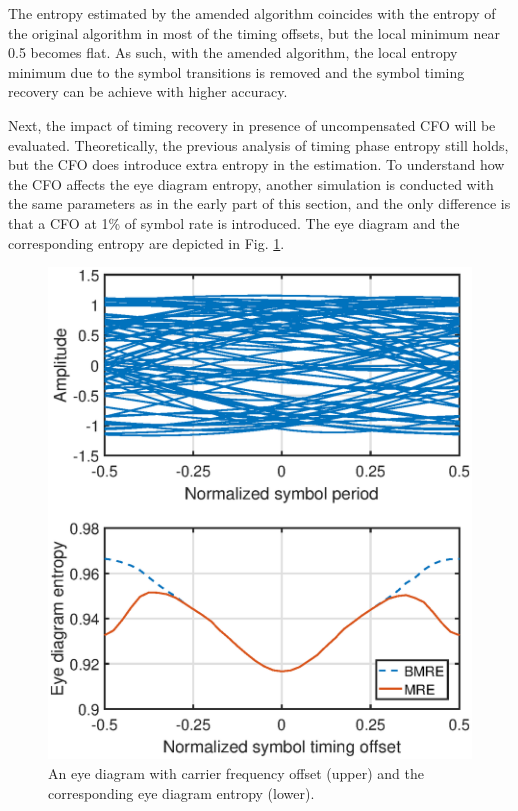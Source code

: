 \documentclass[journal,comsoc,onecolumn, 12pt,draftclsnofoot]{IEEEtran}
\begin{document}
The entropy estimated by the amended algorithm coincides with the entropy of the original algorithm in most of the timing offsets, but the local minimum near 0.5 becomes flat.
As such, with the amended algorithm, the local entropy minimum due to the symbol transitions is removed and the symbol timing recovery can be achieve with higher accuracy.

Next, the impact of timing recovery in presence of uncompensated CFO will be evaluated.  
Theoretically, the previous analysis of timing phase entropy still holds, but the CFO does introduce extra entropy in the estimation.
To understand how the CFO affects the eye diagram entropy, another simulation is conducted with the same parameters as in the early part of this section,
and the only difference is that a CFO at 1\% of symbol rate is introduced.
The eye diagram and the corresponding entropy are depicted in Fig. \ref{fig:timing_freq}.
      
\begin{figure}[ht]
\centering
\includegraphics[width=3 in]{pic/timing_freq.eps}
\caption{An eye diagram with carrier frequency offset (upper) and the corresponding eye diagram entropy (lower).}
\label{fig:timing_freq} 
\end{figure}
\end{document}
